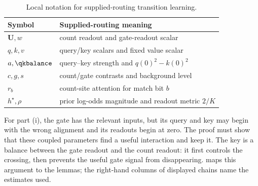 \begin{table}[htbp]
\centering\small
\begin{tabular}{@{}ll@{}}
\toprule
Symbol & Supplied-routing meaning\\
\midrule
$\mathbf U,w$ & count readout and gate-readout scalar\\
$q,k,v$ & query/key scalars and fixed value scalar\\
$a,\qkbalance$ & query--key strength and $q(0)^2-k(0)^2$\\
$c,g,s$ & count/gate contrasts and background level\\
$r_b$ & count-site attention for match bit $b$\\
$h^\star,\rho$ & prior log-odds magnitude and readout metric $2/K$\\
\bottomrule
\end{tabular}
\caption{Local notation for supplied-routing transition learning.}
\label{tab:J-notation}
\end{table}

For part (i), the gate has the relevant inputs, but its query and key may begin with the wrong alignment and its readouts begin at zero.
The proof must show that these coupled parameters find a useful interaction and keep it. The key is a balance between the gate
readout and the count readout: it first controls the crossing, then prevents the useful gate signal from disappearing.
 maps this argument to the lemmas; the right-hand columns of displayed chains name the estimates used.

